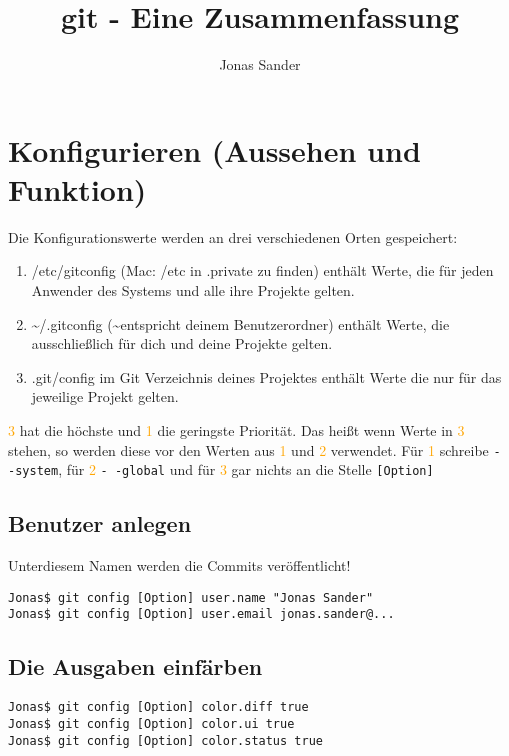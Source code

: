 \documentclass[a4paper,8pt,landscape,twocolumn]{scrartcl}
\title{git - Eine Zusammenfassung}
\author{Jonas Sander}
\begin{document}
\maketitle

\section{Konfigurieren (Aussehen und Funktion)}
Die Konfigurationswerte werden an drei verschiedenen Orten gespeichert:

\begin{enumerate}[label=\color{orange}\theenumi]
\item /etc/gitconfig (Mac: /etc in .private zu finden) enthält Werte, die für jeden Anwender des Systems und alle ihre Projekte gelten.
\item \textasciitilde/.gitconfig (\textasciitilde entspricht deinem Benutzerordner) enthält Werte, die ausschließlich für dich und deine Projekte gelten.
\item .git/config im Git Verzeichnis deines Projektes enthält Werte die nur für das jeweilige Projekt gelten.
\end{enumerate}

\textcolor{orange}{3} hat die höchste und \textcolor{orange}{1} die geringste Priorität. Das heißt wenn Werte in \textcolor{orange}{3} stehen, so werden diese vor den Werten aus \textcolor{orange}{1} und \textcolor{orange}{2} verwendet. Für \textcolor{orange}{1} schreibe \texttt{- -system}, für \textcolor{orange}{2} \texttt{- -global} und für \textcolor{orange}{3} gar nichts an die Stelle \texttt{[Option]}


\subsection{Benutzer anlegen}
Unterdiesem Namen werden die Commits veröffentlicht!
\begin{lstlisting}[style=bash]
Jonas$ git config [Option] user.name "Jonas Sander"
Jonas$ git config [Option] user.email jonas.sander@...
\end{lstlisting}


\subsection{Die Ausgaben einfärben}
\begin{lstlisting}[style=bash]
Jonas$ git config [Option] color.diff true
Jonas$ git config [Option] color.ui true
Jonas$ git config [Option] color.status true
\end{lstlisting}
\end{document}
